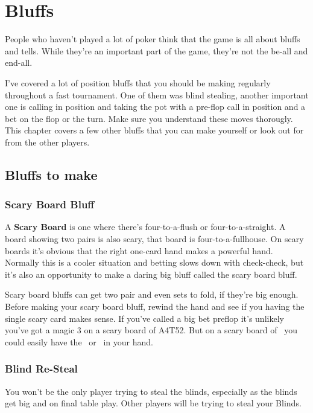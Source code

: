 \chapter{Bluffs}


People who haven't played a lot of poker think that the game
is all about bluffs and tells. While they're an important
part of the game, they're not the be-all and end-all.

I've covered a lot of position bluffs that you should be making
regularly throughout a fast tournament. One of them was
blind stealing, another important one is calling in position and
taking the pot with a pre-flop call in position and a bet on the flop
or the turn. Make sure you understand these moves thorougly. This
chapter covers a few other bluffs that you can make yourself or look
out for from the other players.

\section{Bluffs to make}

\subsection{Scary Board Bluff}

A \textbf{Scary Board} is one where there's four-to-a-flush or
four-to-a-straight. A board showing two pairs is also scary, that
board is four-to-a-fullhouse.  On scary boards it's obvious that the
right one-card hand makes a powerful hand. Normally this is a
cooler situation and betting slows down with check-check, but it's
also an opportunity to make a daring big bluff called the scary board
bluff.

Scary board bluffs can get two pair and even sets to fold, if they're
big enough. Before making your scary board bluff, rewind the hand and
see if you having the single scary card makes sense. If you've called
a big bet preflop it's unlikely you've got a magic 3 on a scary board
of A4T52. But on a scary board of \Ad\nined\sixs\fourd\tred\ you could
easily have the \Kd\ or \Qd\ in your hand.

\subsection{Blind Re-Steal}

You won't be the only player trying to steal the blinds, especially
as the blinds get big and on final table play. Other players will
be trying to steal your Blinds.

